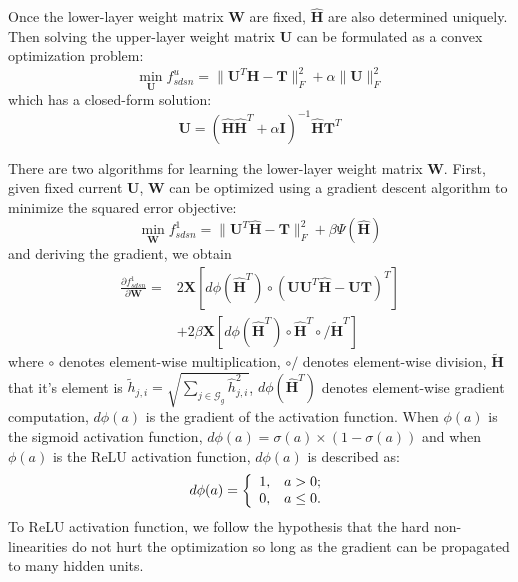 \documentclass[letterpaper]{article}
\begin{document}
Once the lower-layer weight matrix $\textbf{W}$ are fixed, $\widehat{\textbf{H}}$ are also determined uniquely. Then solving the upper-layer weight matrix $\textbf{U}$ can be formulated as a convex optimization problem:
\begin{equation}
\min_{\textbf{U}}f^u_{sdsn} = \|\textbf{U}^T\widehat{\textbf{H}}-\textbf{T}\|^2_F+\alpha\|\textbf{U}\|^2_F
\label{eq:sdsnu}
\end{equation}
which has a closed-form solution:
\begin{equation}
\textbf{U}=(\widehat{\textbf{H}}\widehat{\textbf{H}}^T+\alpha \textbf{I})^{-1}\widehat{\textbf{H}}\textbf{T}^T
\label{eq:sdsnsloveu}
\end{equation}

There are two algorithms for learning the lower-layer weight matrix $\textbf{W}$. First, given fixed current $\textbf{U}$, $\textbf{W}$ can be optimized using a gradient descent algorithm \cite{Deng2011a} to minimize the squared error objective:
\begin{equation}
\min_{\textbf{W}}f^1_{sdsn} = \|\textbf{U}^T\widehat{\textbf{H}}-\textbf{T}\|^2_F+\beta \Psi(\widehat{\textbf{H}})
\label{eq:sdsnw1}
\end{equation}
and deriving the gradient, we obtain
\begin{align}
\frac{\partial f^1_{sdsn} }{\partial \textbf{W}}=&2\textbf{X}\left[d\phi(\widehat{\textbf{H}}^T)\circ(\textbf{U}\textbf{U}^T\widehat{\textbf{H}}-\textbf{U}\textbf{T})^T\right] \nonumber \\
& + 2\beta\textbf{X}\left[d\phi(\widehat{\textbf{H}}^T)\circ\widehat{\textbf{H}}^T\circ/\widetilde{\textbf{H}}^T\right]
\label{eq:sdsnslovew1}
\end{align}
where $\circ$ denotes element-wise multiplication, $\circ/$ denotes element-wise division, $\widetilde{\textbf{H}}$ that it's element is $\widetilde{h}_{j,i}=\sqrt{\sum_{j\in\mathcal{G}_g}\widehat{h}_{j,i}^2}$, $d\phi(\widehat{\textbf{H}}^T)$ denotes element-wise gradient computation, $d\phi(a)$ is the gradient of the activation function. When $\phi(a)$ is the sigmoid activation function, $d\phi(a)=\sigma(a)\times(1-\sigma(a))$ and when $\phi(a)$ is the ReLU activation function, $d\phi(a)$ is described as:
\begin{equation}
 d\phi(a)= \left\{
   \begin{array}{ll}
   1, & \hbox{$a>0$;} \\
   0, & \hbox{$a\leq 0$.}
   \end{array}
   \right.
\label{eq:dphi}
\end{equation}
To ReLU activation function, we follow the hypothesis \cite{Glorot2011} that the hard non-linearities do not hurt the optimization so long as the gradient can be propagated to many hidden units.
\end{document}

